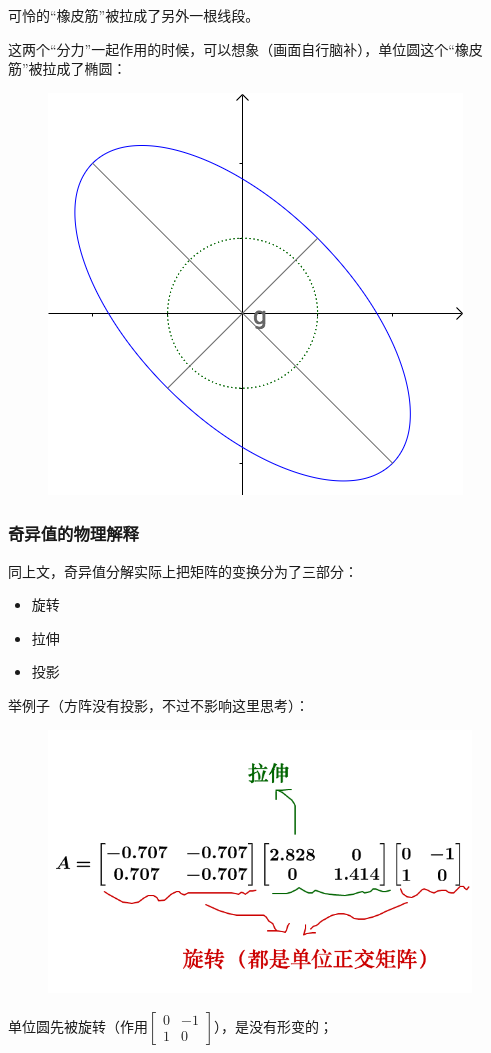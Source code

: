 \documentclass[12pt]{article}
\begin{document}
可怜的“橡皮筋”被拉成了另外一根线段。

这两个“分力”一起作用的时候，可以想象（画面自行脑补），单位圆这个“橡皮筋”被拉成了椭圆：
\begin{figure}[H]
    \centering
    \includegraphics[width=.3\textwidth]{fig/UnderstandSingularValue_5.png}
\end{figure} 

\subsubsection{奇异值的物理解释}
同上文，奇异值分解实际上把矩阵的变换分为了三部分：
\begin{itemize}
\setlength{\itemsep}{0pt}
\setlength{\parsep}{0pt}
\setlength{\parskip}{0pt}
    \item 旋转
    \item 拉伸
    \item 投影
\end{itemize}

举例子（方阵没有投影，不过不影响这里思考）：
\begin{figure}[H]
    \centering
    \includegraphics[width=.8\textwidth]{fig/UnderstandSingularValue_6.png}
\end{figure} 

单位圆先被旋转（作用$\begin{bmatrix}0&-1\\1&0\end{bmatrix}$），是没有形变的；
\end{document}
